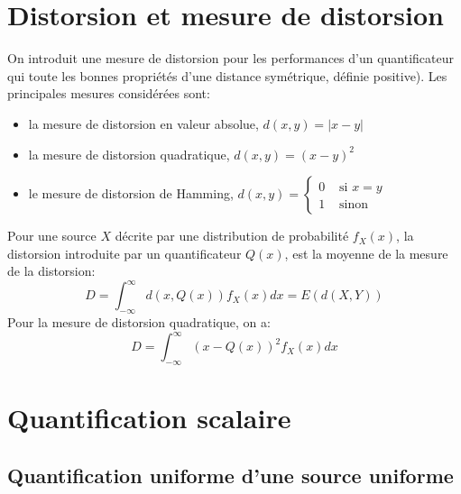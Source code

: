 \documentclass[main.tex]{subfiles}
\begin{document}
\section{Distorsion et mesure de distorsion}
\begin{defin}

  On introduit une mesure de distorsion pour les performances d'un quantificateur qui toute les bonnes propriétés d'une distance symétrique, définie positive). Les principales mesures considérées sont:
  \begin{itemize}
  \item la mesure de distorsion en valeur absolue, $d(x,y) = |x-y|$
  \item la mesure de distorsion quadratique, $d(x,y) = (x-y)^2$
  \item le mesure de distorsion de Hamming, $d(x,y) =
    \begin{cases}
      0 & \text{ si } x=y \\
      1 & \text{ sinon}
    \end{cases}$
  \end{itemize}
\end{defin}

Pour une source $X$ décrite par une distribution de probabilité $f_X(x)$, la distorsion introduite par un quantificateur $Q(x)$, est la moyenne de la mesure de la distorsion:
\[D = \int_{-\infty}^{\infty} d(x,Q(x))f_X(x) dx  = E(d(X,Y))\]
Pour la mesure de distorsion quadratique, on a:
\[D = \int_{-\infty}^{\infty} (x-Q(x))^2f_X(x) dx \]

\section{Quantification scalaire}
\subsection{Quantification uniforme d'une source uniforme}
\end{document}
